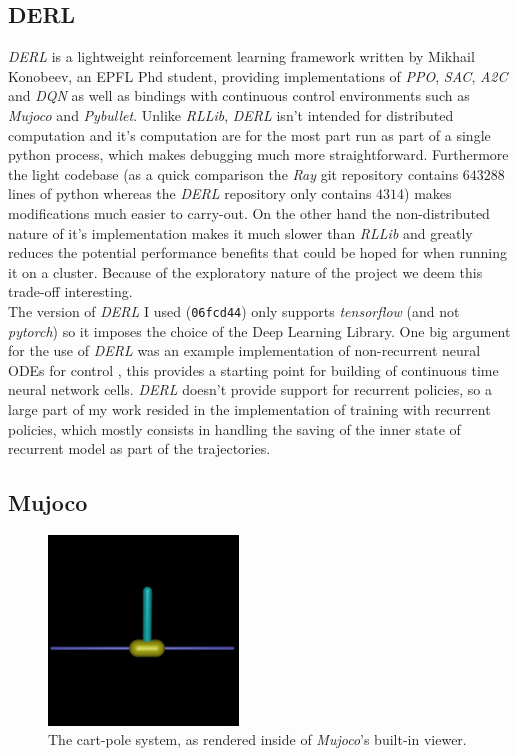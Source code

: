 \subsection{DERL}

\textit{DERL} \cite{konobeev2018} is a lightweight reinforcement learning framework written by Mikhail Konobeev, an EPFL Phd student, providing implementations of \textit{PPO}, \textit{SAC}, \textit{A2C} and \textit{DQN} as well as bindings with continuous control environments such as \textit{Mujoco} and \textit{Pybullet}. Unlike \textit{RLLib}, \textit{DERL} isn't intended for distributed computation and it's computation are for the most part run as part of a single python process, which makes debugging much more straightforward. Furthermore the light codebase (as a quick comparison the \textit{Ray} git repository contains $643288$ lines of python whereas the \textit{DERL} repository only contains $4314$) makes modifications much easier to carry-out. On the other hand the non-distributed nature of it's implementation makes it much slower than \textit{RLLib} and greatly reduces the potential performance benefits that could be hoped for when running it on a cluster. Because of the exploratory nature of the project we deem this trade-off interesting. \\

The version of \textit{DERL} I used (\texttt{06fcd44}) only supports \textit{tensorflow} (and not \textit{pytorch}) so it imposes the choice of the Deep Learning Library. One big argument for the use of \textit{DERL} was an example implementation of non-recurrent neural ODEs for control \cite{konobeev2018}, this provides a starting point for building of continuous time neural network cells. \textit{DERL} doesn't provide support for recurrent policies, so a large part of my work resided in the implementation of training with recurrent policies, which mostly consists in handling the saving of the inner state of recurrent model as part of the trajectories. 

\subsection{Mujoco}

\begin{figure}[h!]
    \centering
    \includegraphics[width=0.45\textwidth]{figures/mujoco_cartpole.png}
    \caption{The cart-pole system, as rendered inside of \textit{Mujoco}'s built-in viewer.}
\end{figure}



